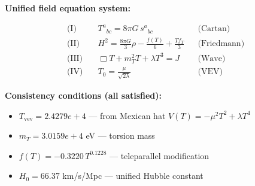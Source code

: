 
\textbf{Unified field equation system:}

\begin{align}
  \text{(I)} \quad & T^a{}_{bc} = 8\pi G \, s^a{}_{bc} && \text{(Cartan)} \\
  \text{(II)} \quad & H^2 = \frac{8\pi G}{3}\rho - \frac{f(T)}{6} + \frac{Tf_T}{3} && \text{(Friedmann)} \\
  \text{(III)} \quad & \Box T + m_T^2 T + \lambda T^3 = J && \text{(Wave)} \\
  \text{(IV)} \quad & T_0 = \frac{\mu}{\sqrt{2\lambda}} && \text{(VEV)}
\end{align}

\textbf{Consistency conditions (all satisfied):}
\begin{itemize}
  \item $T_{\text{vev}} = 2.4279e+4$ — from Mexican hat $V(T) = -\mu^2 T^2 + \lambda T^4$
  \item $m_T = 3.0159e+4$ eV — torsion mass
  \item $f(T) = -0.3220 \, T^{0.1228}$ — teleparallel modification
  \item $H_0 = 66.37$ km/s/Mpc — unified Hubble constant
\end{itemize}